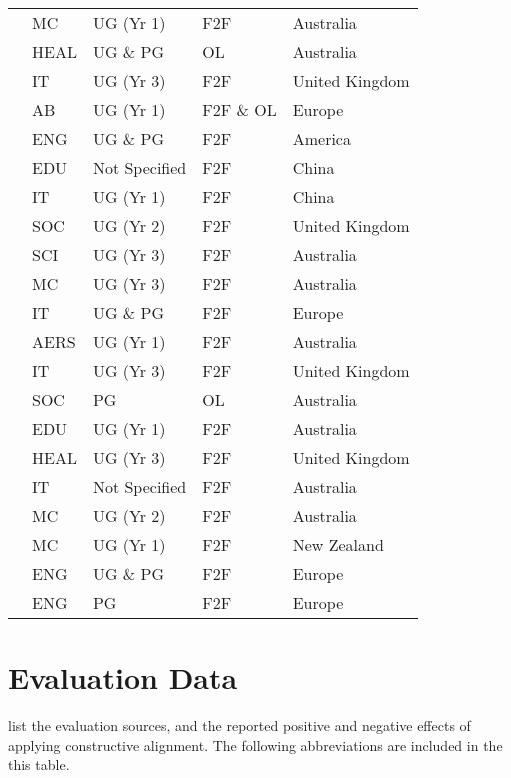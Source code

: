 \begin{center}
\begin{longtable}{|l|l|l|l|l|}
\citet{Kuhn:2009}	&	MC	&	UG (Yr 1)	&	F2F	&	Australia	\\
\citet{raeburn2009blended}	&	HEAL	&	UG \& PG	&	OL	&	Australia	\\
\citet{Hill:2009}	&	IT	&	UG (Yr 3)	&	F2F	&	United Kingdom	\\
\citet{scott2009promoting}	&	AB	&	UG (Yr 1)	&	F2F \& OL	&	Europe	\\
\citet{Schaefer:2009}	&	ENG	&	UG \& PG	&	F2F	&	America	\\
\citet{Qiao:2009}	&	EDU	&	Not Specified	&	F2F	&	China	\\
\citet{Thota:2010}	&	IT	&	UG (Yr 1)	&	F2F	&	China	\\
\citet{Teater:2010}	&	SOC	&	UG (Yr 2)	&	F2F	&	United Kingdom	\\
\citet{hartfield2010reinforcing}	&	SCI	&	UG (Yr 3)	&	F2F	&	Australia	\\
\citet{rossextending}	&	MC	&	UG (Yr 3)	&	F2F	&	Australia	\\
\citet{Shoufan:2010:CRP:1789934.1789937}	&	IT	&	UG \& PG	&	F2F	&	Europe	\\
\citet{Szili:2011}	&	AERS	&	UG (Yr 1)	&	F2F	&	Australia	\\
\citet{andrews2011aligning}	&	IT	&	UG (Yr 3)	&	F2F	&	United Kingdom	\\
\citet{terrell2011using}	&	SOC	&	PG	&	OL	&	Australia	\\
\citet{donnisonre}	&	EDU	&	UG (Yr 1)	&	F2F	&	Australia	\\
\citet{Joseph201252}	&	HEAL	&	UG (Yr 3)	&	F2F	&	United Kingdom	\\
\citet{Pardede:2012}	&	IT	&	Not Specified	&	F2F	&	Australia	\\
\citet{Kenney:2012}	&	MC	&	UG (Yr 2)	&	F2F	&	Australia	\\
\citet{hedgesconstructive}	&	MC	&	UG (Yr 1)	&	F2F	&	New Zealand	\\
\citet{Vanfretti:2011}	&	ENG	&	UG \& PG	&	F2F	&	Europe	\\
\citet{Marlies:2012}	&	ENG	&	PG	&	F2F	&	Europe	\\
\end{longtable}
\end{center}

\clearpage
\section{Evaluation Data} %
\label{sec:evaluation_data}

 list the evaluation sources, and the reported positive and negative effects of applying constructive alignment. The following abbreviations are included in the this table.

